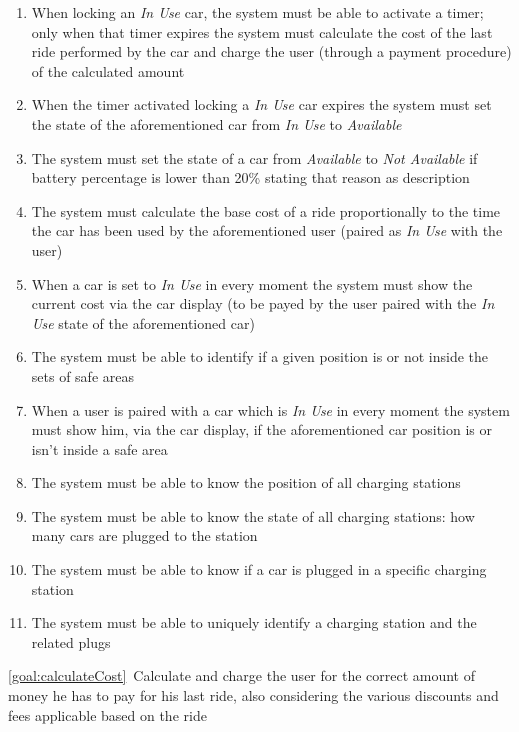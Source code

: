 \begin{description}
\begin{enumerate}[resume*]
  				\item When locking  an \emph{In Use} car, the system must be able to activate a timer;
  				only when that timer expires the system must calculate the cost of the last ride
  				performed by the car and charge the user (through a payment procedure) of the calculated
  				amount
  				\item When the timer activated locking a \emph{In Use} car expires the system must
  				set the state of the aforementioned car from \emph{In Use} to \emph{Available}
  				\item The system must set the state of a car from \emph{Available}
  				to \emph{Not Available} if battery percentage is lower than 20\%  stating that reason
  				as description
  				\item The system must calculate the base cost of a ride proportionally to the time
  				the car has been used by the aforementioned user (paired as \emph{In Use} with the
  				user)
  				\item When a car is set to \emph{In Use} in every moment the system must show the
  				current cost via the car display (to be payed by the user paired with the \emph{In Use}
  				state of the aforementioned car) 
  				\item The system must be able to identify if a given position is or not inside the sets
  				of safe areas
  				\item When a user is paired with a car which is \emph{In Use} in every moment the
  				system must show him, via the car display, if the aforementioned car position is or
  				isn't inside a safe area
  				\item The system must be able to know the position of all charging stations
  				\item The system must be able to know the state of all charging stations: how many
  				cars are plugged to the station
  				\item The system must be able to know if a car is plugged in a specific charging
  				station
  				\item The system must be able to uniquely identify a charging station and the related
  				plugs
   			\end{enumerate}
  		\item \ref{goal:calculateCost}\ Calculate and charge the user for the correct amount of money he has to pay for his last ride, also considering the various discounts and fees applicable based on the ride
  			\begin{enumerate}[resume*]

\end{enumerate}
\end{description}
